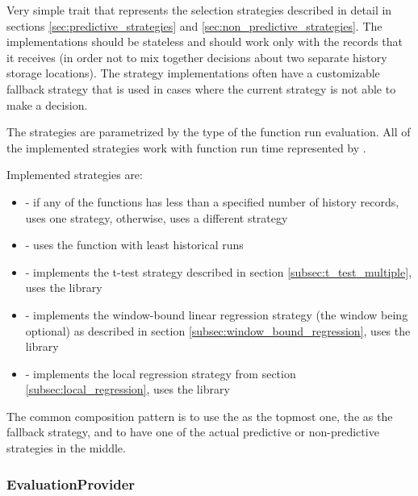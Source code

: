 Very simple trait that represents the selection strategies described in detail in sections \ref{sec:predictive_strategies} and \ref{sec:non_predictive_strategies}. The implementations should be stateless and should work only with the  records that it receives (in order not to mix together decisions about two separate history storage locations). The strategy implementations often have a customizable fallback strategy that is used in cases where the current strategy is not able to make a decision.

The strategies are parametrized by the  type of the function run evaluation. All of the implemented strategies work with function run time represented by .

Implemented strategies are:
\begin{itemize}
	\item {} - if any of the functions has less than a specified number of history records, uses one strategy, otherwise, uses a different strategy
	\item {} - uses the function with least historical runs
	\item {} - implements the t-test strategy described in section \ref{subsec:t_test_multiple}, uses the  library
	\item {} - implements the window-bound linear regression strategy (the window being optional) as described in section \ref{subsec:window_bound_regression}, uses the  library
	\item {} - implements the local regression strategy from section \ref{subsec:local_regression}, uses the  library
\end{itemize}

The common composition pattern is to use the  as the topmost one, the  as the fallback strategy, and to have one of the actual predictive or non-predictive strategies in the middle.

\subsubsection{EvaluationProvider}

